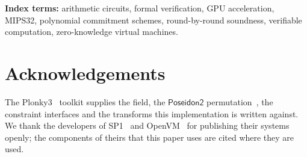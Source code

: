 \documentclass[10pt,letterpaper]{article}
\theoremstyle{definition}
\theoremstyle{remark}
\theoremstyle{plain}
\newcommand{\Poseidon}{\ensuremath{\mathsf{Poseidon2}}}
\begin{document}
\noindent\textbf{Index terms:} arithmetic circuits, formal verification, GPU acceleration, MIPS32, polynomial commitment schemes, round-by-round soundness, verifiable computation, zero-knowledge virtual machines.













\FloatBarrier

\FloatBarrier


\section*{Acknowledgements}

The Plonky3~\citep{plonky3} toolkit supplies the field, the $\Poseidon{}$ permutation~\citep{poseidon2}, the constraint interfaces and the transforms this implementation is written against. We thank the developers of SP1~\citep{sp1,sp1-hypercube} and OpenVM~\citep{openvm} for publishing their systems openly; the components of theirs that this paper uses are cited where they are used.

\FloatBarrier
\appendix

\FloatBarrier

\FloatBarrier


\clearpage



\end{document}
